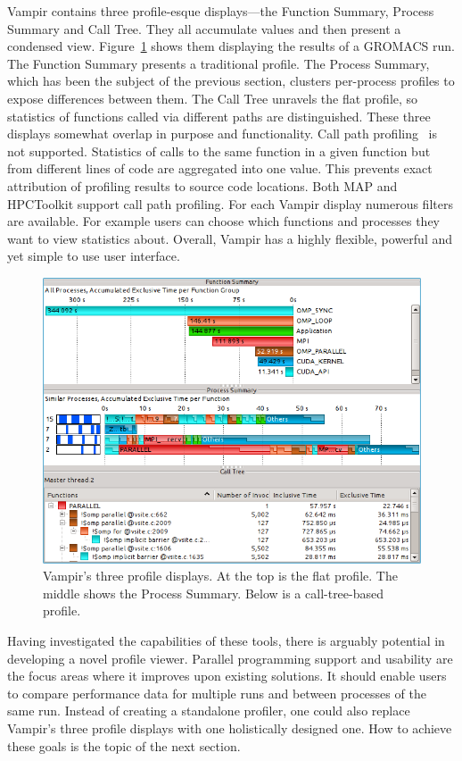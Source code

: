\documentclass[a4paper, final, diplominf]{zih-template}
\begin{document}
Vampir contains three profile-esque displays---the Function Summary, Process Summary and Call Tree.
They all accumulate values and then present a condensed view.
Figure~\ref{fig:profile-displays-in-vampir} shows them displaying the results of a GROMACS run.
The Function Summary presents a traditional profile.
The Process Summary, which has been the subject of the previous section, clusters per-process profiles to expose differences between them.
The Call Tree unravels the flat profile, so statistics of functions called via different paths are distinguished.
These three displays somewhat overlap in purpose and functionality.
Call path profiling~\cite{hall92} is not supported.
Statistics of calls to the same function in a given function but from different lines of code are aggregated into one value.
This prevents exact attribution of profiling results to source code locations.
Both MAP and HPCToolkit support call path profiling.
For each Vampir display numerous filters are available.
For example users can choose which functions and processes they want to view statistics about.
Overall, Vampir has a highly flexible, powerful and yet simple to use user interface.
\begin{figure}[tb]
	\centering
	\includegraphics[width=13.08cm]{profile-displays-in-vampir}
	\caption{Vampir's three profile displays. At the top is the flat profile. The middle shows the Process Summary. Below is a call-tree-based profile.}
	\label{fig:profile-displays-in-vampir}
\end{figure}

Having investigated the capabilities of these tools, there is arguably potential in developing a novel profile viewer.
Parallel programming support and usability are the focus areas where it improves upon existing solutions.
It should enable users to compare performance data for multiple runs and between processes of the same run.
Instead of creating a standalone profiler, one could also replace Vampir's three profile displays with one holistically designed one.
How to achieve these goals is the topic of the next section.
\end{document}
